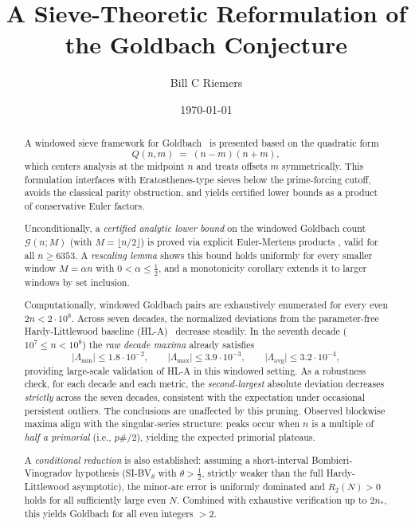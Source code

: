 \documentclass[11pt]{article}
\title{A Sieve-Theoretic Reformulation of the Goldbach Conjecture}
\author{Bill C Riemers}
\date{\today}
\theoremstyle{inline}
\theoremstyle{break}
\theoremstyle{break}
\theoremstyle{break}
\theoremstyle{break}
\theoremstyle{break}
\theoremstyle{break}
\theoremstyle{break}
\theoremstyle{inline}
\newcommand{\xMertens}{6353} %
\newcommand{\xLambdaMinLimit}{1.8\cdot 10^{-2}} %
\newcommand{\xLambdaMaxLimit}{3.9\cdot 10^{-3}} %
\newcommand{\xLambdaAvgLimit}{3.2\cdot 10^{-4}} %
\newcommand{\tavg}{{\scriptscriptstyle\mathrm{avg}}}
\newcommand{\nprodstar}{n_{\ast}}  %
\begin{document}
\maketitle

\begin{abstract}
A windowed sieve framework for Goldbach~\cite{GoldbachSurvey,Ribenboim1991} is presented based on the quadratic form
\begin{equation}
Q(n,m)\;=\;(n-m)(n+m),
\end{equation}
which centers analysis at the midpoint \(n\) and treats offsets \(m\) symmetrically. This formulation interfaces with Eratosthenes-type sieves below the prime-forcing cutoff, avoids the classical parity obstruction, and yields certified lower bounds as a product of conservative Euler factors.

Unconditionally, a \emph{certified analytic lower bound} on the windowed Goldbach count \(\mathcal{G}(n;M)\) (with \(M=\lfloor n/2\rfloor\)) is proved via explicit Euler-Mertens products \cite{Mertens1874,MontgomeryVaughan2007,RosserSchoenfeld1962,Dusart2010}, valid for all \(n\ge \xMertens\). A \emph{rescaling lemma} shows this bound holds uniformly for every smaller window \(M=\alpha n\) with \(0<\alpha\le \tfrac12\), and a monotonicity corollary extends it to larger windows by set inclusion.

Computationally, windowed Goldbach pairs are exhaustively enumerated for every even \(2n<2\cdot 10^8\). 
Across seven decades, the normalized deviations from the parameter-free Hardy-Littlewood baseline (HL-A)~\cite{HardyLittlewood1923} decrease steadily. 
In the seventh decade (\(10^7 \le n < 10^8\)) the \emph{raw decade maxima} already satisfies
\begin{equation}
\lvert\Lambda_{\min}\rvert\le \xLambdaMinLimit,\qquad
\lvert\Lambda_{\max}\rvert\le \xLambdaMaxLimit,\qquad
\lvert\Lambda_{\tavg}\rvert\le \xLambdaAvgLimit,
\end{equation}
providing large-scale validation of HL-A in this windowed setting.
As a robustness check, for each decade and each metric, the \emph{second-largest} absolute deviation decreases \emph{strictly} across the seven decades, consistent with the expectation under occasional persistent outliers.  The conclusions are unaffected by this pruning.
Observed blockwise maxima align with the singular-series structure: peaks occur when \(n\) is a multiple of \emph{half a primorial} (i.e., \(p\#/2\)), yielding the expected primorial plateaus.

A \emph{conditional reduction} is also established: assuming a short-interval Bombieri-Vinogradov hypothesis (SI-BV\(_\theta\) with \(\theta>\tfrac12\), strictly weaker than the full Hardy-Littlewood asymptotic), the minor-arc error is uniformly dominated and \(R_2(N)>0\) holds for all sufficiently large even \(N\). Combined with exhaustive verification up to \(2\nprodstar\), this yields Goldbach for all even integers \(>2\).


\end{abstract}
\end{document}
